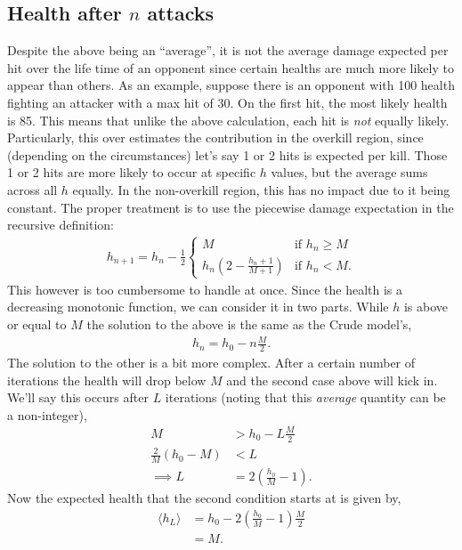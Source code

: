 			\subsection{Health after \texorpdfstring{$n$}{} attacks}
				Despite the above being an ``average'', it is not the average damage expected per hit over the life time of an opponent since certain healths are much more likely to appear than others. As an example, suppose there is an opponent with 100 health fighting an attacker with a max hit of 30. On the first hit, the most likely health is 85. This means that unlike the above calculation, each hit is \emph{not} equally likely. Particularly, this over estimates the contribution in the overkill region, since (depending on the circumstances) let's say 1 or 2 hits is expected per kill. Those 1 or 2 hits are more likely to occur at specific $h$ values, but the average sums across all $h$ equally. In the non-overkill region, this has no impact due to it being constant. The proper treatment is to use the piecewise damage expectation in the recursive definition:
				\begin{align}
					h_{n+1} = h_{n} - \frac{1}{2}\begin{cases}
						M &\text{if $h_n \ge M$} \\
						h_n\left(2 - \frac{h_n + 1}{M+1}\right) &\text{if $h_n < M$}.
					\end{cases}
				\end{align}
				This however is too cumbersome to handle at once. Since the health is a decreasing monotonic function, we can consider it in two parts. While $h$ is above or equal to $M$ the solution to the above is the same as the Crude model's,
				\begin{align}
					h_n = h_0 - n\frac{M}{2}.\label{eq:h_crude}
				\end{align}
				The solution to the other is a bit more complex. After a certain number of iterations the health will drop below $M$ and the second case above will kick in. We'll say this occurs after $L$ iterations (noting that this \emph{average} quantity can be a non-integer),
				\begin{align}
					M &> h_0 - L\frac{M}{2} \\
					\frac{2}{M}(h_0 - M) &< L \\
					\implies L &= 2\left(\frac{h_0}{M} - 1\right).
				\end{align}
				Now the expected health that the second condition starts at is given by,
				\begin{align}
					\langle h_L \rangle &= h_0 - 2\left(\frac{h_0}{M} - 1\right) \frac{M}{2}\\
					&= M.
				\end{align}
